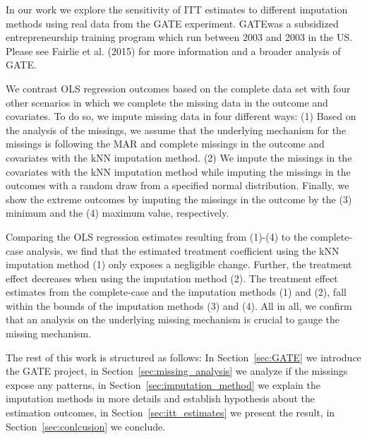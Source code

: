 In our work we explore the sensitivity of \ac{ITT} estimates to different imputation methods using real data from the \ac{GATE} experiment. \ac{GATE}was a subsidized entrepreneurship training program which run between 2003 and 2003 in the US. Please see Fairlie et al. (2015) for more information and a broader analysis of \ac{GATE}.

We contrast \ac{OLS} regression outcomes based on the complete data set with four other scenarios in which we complete the missing data in the outcome and covariates. To do so, we impute missing data in four different ways: (1) Based on the analysis of the missings, we assume that the underlying mechanism for the missings is following the \ac{MAR} and complete missings in the outcome and covariates with the \ac{kNN} imputation method. (2) We impute the missings in the covariates with the \ac{kNN} imputation method while imputing the missings in the outcomes with a random draw from a specified normal distribution. Finally, we show the extreme outcomes by imputing the missings in the outcome by the (3) minimum and the (4) maximum value, respectively.

Comparing the \ac{OLS} regression estimates resulting from (1)-(4) to the complete-case analysis, we find that the estimated treatment coefficient using the \ac{kNN} imputation method (1) only exposes a negligible change. Further, the treatment effect decreases when using the imputation method (2). The treatment effect estimates from the complete-case and the imputation methods (1) and (2), fall within the bounds of the imputation methods (3) and (4). All in all, we confirm that an analysis on the underlying missing mechanism is crucial to gauge the missing mechanism.

The rest of this work is structured as follows: In Section~\ref{sec:GATE} we introduce the \ac{GATE} project, in Section~\ref{sec:missing_analysis} we analyze if the missings expose any patterns, in Section~\ref{sec:imputation_method} we explain the imputation methods in more details and establish hypothesis about the estimation outcomes, in Section~\ref{sec:itt_estimates} we present the result, in Section~\ref{sec:conlcusion} we conclude.
